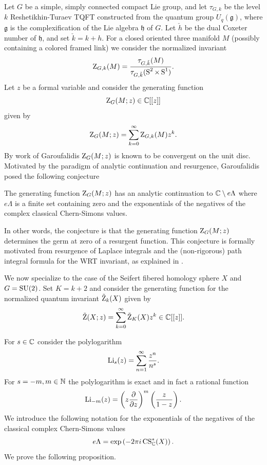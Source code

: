 Let $G$ be a simple, simply connected compact Lie group, and let $\tau_{G,k}$ be the level $k$ Reshetikhin-Turaev TQFT constructed from the quantum group $U_q(\mathfrak{g})$, where $\mathfrak{g}$ is the complexification of the Lie algebra $\mathfrak{h}$ of $G$. Let $\check{h}$ be the dual Coxeter number of $\mathfrak{h}$, and set $\check{k}=k+h$. For a closed oriented three manifold $M$ (possibly containing a colored framed link) we consider the normalized invariant \begin{equation}
\operatorname{Z}_{G,k}(M)= \frac{\tau_{G,\check{k}}(M)}{\tau_{G,\check{k} }(\operatorname{S}^2 \times \operatorname{S}^1)}.
\end{equation}
Let $z$ be a formal variable and consider the generating function $$\operatorname{Z}_{G}(M;z) \in \mathbb{C}[[z]]$$
given by
\begin{equation} \label{eq:GeneratingFunction}
\operatorname{Z}_G(M;z) = \sum_{k=0}^{\infty} \operatorname{Z}_{G,k}(M) z^k.
\end{equation}
By work of Garoufalidis  $\operatorname{Z}_{G}(M;z) $ is known to be convergent on the unit disc. Motivated by the paradigm of analytic continuation and resurgence, Garoufalidis posed the following conjecture

\begin{conjecture} \label{conj:GeneratingFunction}
	The generating function $\operatorname{Z}_{G}(M;z)$ has an analytic continuation to $\mathbb{C}\setminus e \Lambda$ where $e \Lambda$ is a finite set containing zero and the exponentials of the negatives of the complex classical Chern-Simons values.
\end{conjecture}

In other words, the conjecture is that the generating function $\operatorname{Z}_{G}(M;z)$ determines the germ at zero of a resurgent function. This conjecture is formally motivated from resurgence of Laplace integrals and the (non-rigorous) path integral formula for the WRT invariant, as explained in \cite{Garoufalidis08}.

We now specialize to the case of the Seifert fibered homology sphere $X$ and $G=\operatorname{SU}(2)$. Set $K=k+2$ and consider the generating function for the normalized quantum invariant $\tilde{\operatorname{Z}}_k(X)$ given by
\begin{equation} \label{eq:NGeneratingFunction}
\tilde{\operatorname{Z}}(X;z) =\sum_{k=0}^{\infty} \tilde{\operatorname{Z}}_K(X) z^k  \in \mathbb{C}[[z]].
\end{equation}

For $s \in \mathbb{C}$ consider the polylogarithm
\begin{equation} \label{eq:polylogarithm}
\operatorname{Li}_{s}(z) = \sum_{n=1}^{\infty} \frac{z^n}{n^s}.
\end{equation}
For $s=-m, m \in \mathbb{N}$ the polylogarithm is exact and in fact a rational function 
\begin{equation}
\operatorname{Li}_{-m} (z)= \left( z\frac{\partial }{\partial z} \right)^m \left( \frac{z}{1-z}\right).
\end{equation}
We introduce the following notation for the exponentials of the negatives of the classical complex Chern-Simons values
\begin{equation}
e \Lambda = \exp\left(- 2\pi i \operatorname{CS}^*_{\mathbb{C}}(X) \right).
\end{equation}
We prove the following proposition.

